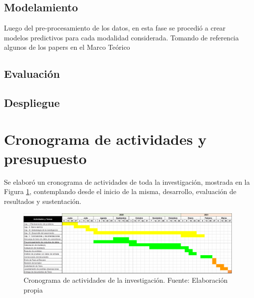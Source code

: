 \subsection{Modelamiento}
Luego del pre-procesamiento de los datos, en esta fase se procedió a crear modelos predictivos para cada modalidad considerada. Tomando de referencia algunos de los papers en el Marco Teórico


\subsection{Evaluación}

\subsection{Despliegue}


\section{Cronograma de actividades y presupuesto}
Se elaboró un cronograma de actividades de toda la investigación, mostrada en la Figura \ref{3:fig5}, contemplando desde el inicio de la misma, desarrollo, evaluación de resultados y sustentación.
\begin{figure}[h]
	\begin{center}
		\includegraphics[width=1.1\textwidth]{3/figures/cronograma.png}
		\caption{Cronograma de actividades de la investigación. Fuente: Elaboración propia}
		\label{3:fig5}
	\end{center}
\end{figure}